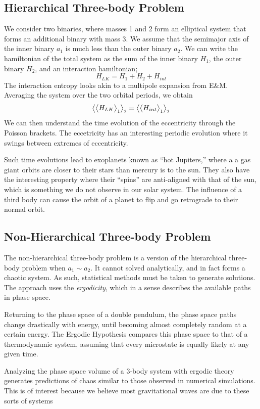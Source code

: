 \subsection{Hierarchical Three-body Problem}
We consider two binaries, where masses 1 and 2 form an elliptical system that forms an additional binary with mass 3. We assume that the semimajor axis of the inner binary \(a_1\) is much less than the outer binary \(a_2\). We can write the hamiltonian of the total system as the sum of the inner binary \(H_1\), the outer binary \(H_2\), and an interaction hamiltonian;
\begin{equation}
	H_{LK} = H_1+H_2+H_{int}
\end{equation}
The interaction entropy looks akin to a multipole expansion from E\&M. Averaging the system over the two orbital periods, we obtain
\[\left\langle \begin{matrix}\left\langle \begin{matrix}H_{LK}\end{matrix} \right\rangle_1\end{matrix} \right\rangle_2=\left\langle \begin{matrix}\left\langle \begin{matrix}H_{int}\end{matrix} \right\rangle_1\end{matrix} \right\rangle_2\]
We can then understand the time evolution  of the eccentricity through the Poisson brackets. The eccetricity has an interesting periodic evolution where it swings between extremes of eccentricity.

Such time evolutions lead to exoplanets known as ``hot Jupiters,'' where a a gas giant orbits are closer to their stars than mercury is to the sun. They also have the interesting property where their ``spins'' are anti-aligned with that of the sun, which is something we do not observe in our solar system. The influence of a third body can cause the orbit of a planet to flip and go retrograde to their normal orbit.

\subsection{Non-Hierarchical Three-body Problem}
The non-hierarchical three-body problem is a version of the hierarchical three-body problem when \(a_1\sim a_2\). It cannot solved analytically, and in fact forms a chaotic system. As such, statistical methods must be taken to generate solutions. The approach uses the \emph{ergodicity}, which in a sense describes the available paths in phase space.

Returning to the phase space of a double pendulum, the phase space paths change drastically with energy, until becoming almost completely random at a certain energy. The Ergodic Hypothesis compares this phase space to that of a thermodynamic system, assuming that every microstate is equally likely at any given time.

Analyzing the phase space volume of a 3-body system with ergodic theory generates predictions of chaos similar to those observed in numerical simulations. This is of interest because we believe most gravitational waves are due to these sorts of systems

